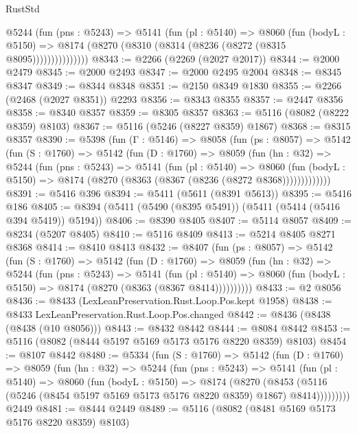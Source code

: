 \begin{lexlean}{RustStd}
\begin{coremodule}
              @5244
                (fun (pns : @5243) =>
                @5141
                  (fun (pl : @5140) =>
                  @8060
                    (fun (bodyL : @5150) =>
                    @8174 (@8270 (@8310 (@8314 (@8236 (@8272 (@8315 @8095)))))))))))))))
@8343 := @2266 (@2269 (@2027 @2017))
@8344 := @2000 @2479
@8345 := @2000 @2493
@8347 := @2000 @2495 @2004
@8348 := @8345 @8347
@8349 := @8344 @8348
@8351 := @2150 @8349 @1830
@8355 := @2266 (@2468 (@2027 @8351)) @2293
@8356 := @8343 @8355
@8357 := @2447 @8356
@8358 := @8340 @8357
@8359 := @8305 @8357
@8363 := @5116 (@8082 (@8222 @8359) @8103)
@8367 := @5116 (@5246 (@8227 @8359) @1867)
@8368 := @8315 @8357
@8390 := @5398
    (fun (Γ : @5146) =>
    @8058
      (fun (ps : @8057) =>
      @5142
        (fun (S : @1760) =>
        @5142
          (fun (D : @1760) =>
          @8059
            (fun (hn : @32) =>
            @5244
              (fun (pns : @5243) =>
              @5141
                (fun (pl : @5140) =>
                @8060
                  (fun (bodyL : @5150) =>
                  @8174 (@8270 (@8363 (@8367 (@8236 (@8272 @8368)))))))))))))
@8391 := @5416 @396
@8394 := @5411 (@5611 (@8391 @5613))
@8395 := @5416 @186
@8405 := @8394 (@5411 (@5490 (@8395 @5491)) (@5411 (@5414 (@5416 @394 @5419)) @5194))
@8406 := @8390 @8405
@8407 := @5114 @8057
@8409 := @8234 (@5207 @8405)
@8410 := @5116 @8409
@8413 := @5214 @8405 @8271 @8368
@8414 := @8410 @8413
@8432 := @8407
    (fun (ps : @8057) =>
    @5142
      (fun (S : @1760) =>
      @5142
        (fun (D : @1760) =>
        @8059
          (fun (hn : @32) =>
          @5244
            (fun (pns : @5243) =>
            @5141
              (fun (pl : @5140) =>
              @8060 (fun (bodyL : @5150) => @8174 (@8270 (@8363 (@8367 @8414))))))))))
@8433 := @2 @8056
@8436 := @8433 (LexLeanPreservation.Rust.Loop.Pos.kept @1958)
@8438 := @8433 LexLeanPreservation.Rust.Loop.Pos.changed
@8442 := @8436 (@8438 (@8438 (@10 @8056)))
@8443 := @8432 @8442
@8444 := @8084 @8442
@8453 := @5116 (@8082 (@8444 @5197 @5169 @5173 @5176 @8220 @8359) @8103)
@8454 := @8107 @8442
@8480 := @5334
    (fun (S : @1760) =>
    @5142
      (fun (D : @1760) =>
      @8059
        (fun (hn : @32) =>
        @5244
          (fun (pns : @5243) =>
          @5141
            (fun (pl : @5140) =>
            @8060
              (fun (bodyL : @5150) =>
              @8174
                (@8270
                  (@8453
                    (@5116 (@5246 (@8454 @5197 @5169 @5173 @5176 @8220 @8359) @1867) @8414)))))))))
    @2449
@8481 := @8444 @2449
@8489 := @5116 (@8082 (@8481 @5169 @5173 @5176 @8220 @8359) @8103)

\end{coremodule}
\end{lexlean}
